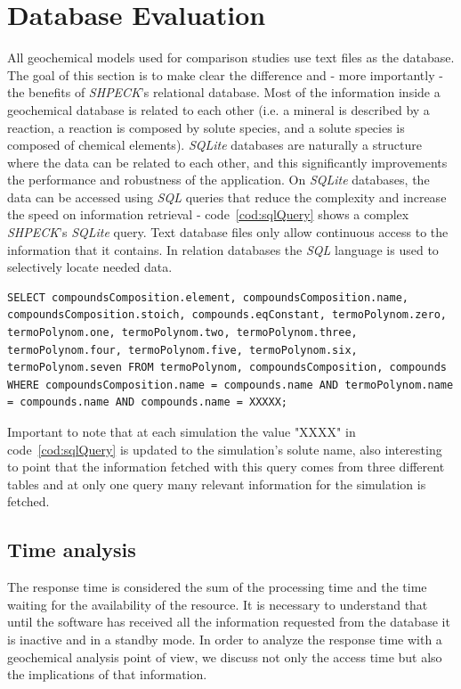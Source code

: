 \section{Database Evaluation}
All geochemical models used for comparison studies use text files as the database. The goal of this section is to make clear the difference and - more importantly - the benefits of \emph{SHPECK}'s relational database. Most of the information inside a geochemical database is related to each other (i.e. a mineral is described by a reaction, a reaction is composed by solute species, and a solute species is composed of chemical elements). \emph{SQLite} databases are naturally a structure where the data can be related to each other, and this significantly improvements the performance and robustness of the application. On \emph{SQLite} databases, the data can be accessed using \emph{SQL} queries that reduce the complexity and increase the speed on information retrieval - code~\ref{cod:sqlQuery} shows a complex \emph{SHPECK}'s \emph{SQLite} query. Text database files only allow continuous access to the information that it contains. In relation databases the \emph{SQL} language is used to selectively locate needed data. 


\begin{minipage}{\linewidth}
\begin{lstlisting}[frame=single, label=cod:sqlQuery, caption=\emph{SHPECK}'s \emph{SQLite} example query]
SELECT compoundsComposition.element, compoundsComposition.name, compoundsComposition.stoich, compounds.eqConstant, termoPolynom.zero, termoPolynom.one, termoPolynom.two, termoPolynom.three, termoPolynom.four, termoPolynom.five, termoPolynom.six, termoPolynom.seven FROM termoPolynom, compoundsComposition, compounds WHERE compoundsComposition.name = compounds.name AND termoPolynom.name = compounds.name AND compounds.name = XXXXX;
\end{lstlisting}
\end{minipage}

Important to note that at each simulation the value "XXXX" in code~\ref{cod:sqlQuery} is updated to the simulation's solute name, also interesting to point that the information fetched with this query comes from three different tables and at only one query many relevant information for the simulation is fetched.

\subsection{Time analysis}
The response time is considered the sum of the processing time and the time waiting for the availability of the resource. It is necessary to understand that until the software has received all the information requested from the database it is inactive and in a standby mode. In order to analyze the response time with a geochemical analysis point of view, we discuss not only the access time but also the implications of that information.

